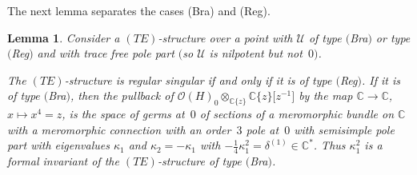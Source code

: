 \documentclass[pdftex]{sigma}%
\numberwithin{equation}{section}
\numberwithin{figure}{section}
\newcommand{\C}{{\mathbb C}}
\newcommand{\OO}{{\mathcal O}}
\newcommand{\UU}{{\mathcal U}}
\newtheorem{Lemma}[Theorem]{Lemma}
\begin{document}
The next lemma separates the cases (Bra) and (Reg).

\begin{Lemma}\label{t4.9}
Consider a $(TE)$-structure over a point with
$\UU$ of type $($Bra$)$ or type $($Reg$)$ and with trace free pole part
$($so $\UU$ is nilpotent but not~$0)$.

The $(TE)$-structure is regular singular if and only
if it is of type $($Reg$)$. If it is of type $($Bra$)$,
then the pullback of
$\OO(H)_0\otimes_{\C\{z\}}\C\{z\}\big[z^{-1}\big]$
by the map $\C\to\C$, $x\mapsto x^4=z$,
is the space of germs at~$0$ of sections of a meromorphic bundle
on $\C$ with a meromorphic connection
with an order~$3$ pole at~$0$ with semisimple pole part with
eigenvalues $\kappa_1$ and $\kappa_2=-\kappa_1$ with
$-\frac{1}{4}\kappa_1^2=\delta^{(1)}\in\C^*$.
Thus $\kappa_1^2$ is a formal invariant of the
$(TE)$-structure of type $($Bra$)$.
\end{Lemma}
\end{document}
